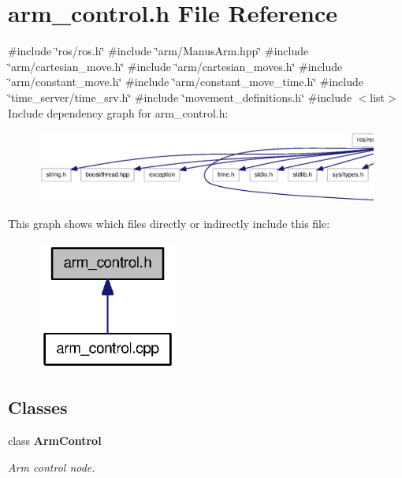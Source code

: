 \section{arm\-\_\-control.\-h \-File \-Reference}
\label{arm__control_8h}
{\ttfamily \#include \char`\"{}ros/ros.\-h\char`\"{}}\*
{\ttfamily \#include \char`\"{}arm/\-Manus\-Arm.\-hpp\char`\"{}}\*
{\ttfamily \#include \char`\"{}arm/cartesian\-\_\-move.\-h\char`\"{}}\*
{\ttfamily \#include \char`\"{}arm/cartesian\-\_\-moves.\-h\char`\"{}}\*
{\ttfamily \#include \char`\"{}arm/constant\-\_\-move.\-h\char`\"{}}\*
{\ttfamily \#include \char`\"{}arm/constant\-\_\-move\-\_\-time.\-h\char`\"{}}\*
{\ttfamily \#include \char`\"{}time\-\_\-server/time\-\_\-srv.\-h\char`\"{}}\*
{\ttfamily \#include \char`\"{}movement\-\_\-definitions.\-h\char`\"{}}\*
{\ttfamily \#include $<$list$>$}\*
\-Include dependency graph for arm\-\_\-control.\-h\-:\nopagebreak
\begin{figure}[H]
\begin{center}
\leavevmode
\includegraphics[width=350pt]{arm__control_8h__incl}
\end{center}
\end{figure}
\-This graph shows which files directly or indirectly include this file\-:\nopagebreak
\begin{figure}[H]
\begin{center}
\leavevmode
\includegraphics[width=130pt]{arm__control_8h__dep__incl}
\end{center}
\end{figure}
\subsection*{\-Classes}
\begin{DoxyCompactItemize}
\item 
class {\bf \-Arm\-Control}
\begin{DoxyCompactList}\small\item\em \-Arm control node. \end{DoxyCompactList}\end{DoxyCompactItemize}
